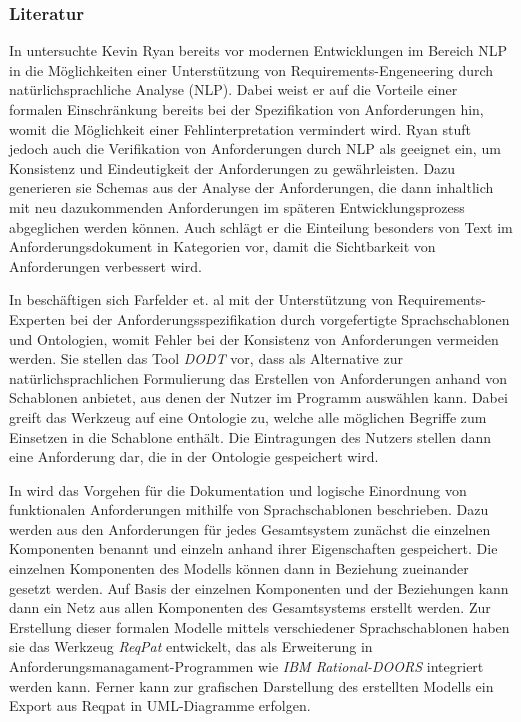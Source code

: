 \documentclass[12pt]{report}
\begin{document}
\subsubsection{Literatur}
In \cite{kr93} untersuchte Kevin Ryan bereits vor modernen Entwicklungen im Bereich NLP in die Möglichkeiten einer Unterstützung von Requirements-Engeneering durch natürlichsprachliche Analyse (NLP). Dabei weist er auf die Vorteile einer formalen Einschränkung bereits bei der Spezifikation von Anforderungen hin, womit die Möglichkeit einer Fehlinterpretation vermindert wird. Ryan stuft jedoch auch die Verifikation von Anforderungen durch NLP als geeignet ein, um Konsistenz und Eindeutigkeit der Anforderungen zu gewährleisten. Dazu generieren sie Schemas aus der Analyse der Anforderungen, die dann inhaltlich mit neu dazukommenden Anforderungen im späteren Entwicklungsprozess abgeglichen werden können. Auch schlägt er die Einteilung besonders von Text im Anforderungsdokument in Kategorien vor, damit die Sichtbarkeit von Anforderungen verbessert wird.

\vspace{12pt}

In \cite{sf11} beschäftigen sich Farfelder et. al mit der Unterstützung von Requirements-Experten bei der Anforderungsspezifikation durch vorgefertigte Sprachschablonen und Ontologien, womit Fehler bei der Konsistenz von Anforderungen vermeiden werden. Sie stellen das Tool \textit{DODT} vor, dass als Alternative zur natürlichsprachlichen Formulierung das Erstellen von Anforderungen anhand von Schablonen anbietet, aus denen der Nutzer im Programm auswählen kann. Dabei greift das Werkzeug auf eine Ontologie zu, welche alle möglichen Begriffe zum Einsetzen in die Schablone enthält. Die Eintragungen des Nutzers stellen dann eine Anforderung dar, die in der Ontologie gespeichert wird.

\vspace{12pt}

In \cite{fh14} wird das Vorgehen für die Dokumentation und logische Einordnung von funktionalen Anforderungen mithilfe von Sprachschablonen beschrieben. Dazu werden aus den Anforderungen für jedes Gesamtsystem zunächst die einzelnen Komponenten benannt und einzeln anhand ihrer Eigenschaften gespeichert. Die einzelnen Komponenten des Modells können dann in Beziehung zueinander gesetzt werden. Auf Basis der einzelnen Komponenten und der Beziehungen kann dann ein Netz aus allen Komponenten des Gesamtsystems erstellt werden. Zur Erstellung dieser formalen Modelle mittels verschiedener Sprachschablonen haben sie das Werkzeug \textit{ReqPat} entwickelt, das als Erweiterung in Anforderungsmanagament-Programmen wie \textit{IBM Rational-DOORS} integriert werden kann. Ferner kann zur grafischen Darstellung des erstellten Modells ein Export aus Reqpat in UML-Diagramme erfolgen.
\end{document}

